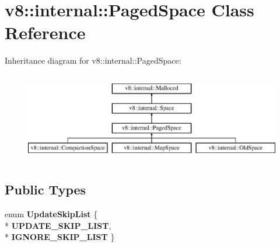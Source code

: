 \hypertarget{classv8_1_1internal_1_1_paged_space}{}\section{v8\+:\+:internal\+:\+:Paged\+Space Class Reference}
\label{classv8_1_1internal_1_1_paged_space}
Inheritance diagram for v8\+:\+:internal\+:\+:Paged\+Space\+:\begin{figure}[H]
\begin{center}
\leavevmode
\includegraphics[height=3.929825cm]{classv8_1_1internal_1_1_paged_space}
\end{center}
\end{figure}
\subsection*{Public Types}
\begin{DoxyCompactItemize}
\item 
enum {\bfseries Update\+Skip\+List} \{ \\*
{\bfseries U\+P\+D\+A\+T\+E\+\_\+\+S\+K\+I\+P\+\_\+\+L\+I\+ST}, 
\\*
{\bfseries I\+G\+N\+O\+R\+E\+\_\+\+S\+K\+I\+P\+\_\+\+L\+I\+ST}
 \}\hypertarget{classv8_1_1internal_1_1_paged_space_afe936e2f7428f4db89715fd29f50e2f1}{}\label{classv8_1_1internal_1_1_paged_space_afe936e2f7428f4db89715fd29f50e2f1}

\end{DoxyCompactItemize}

